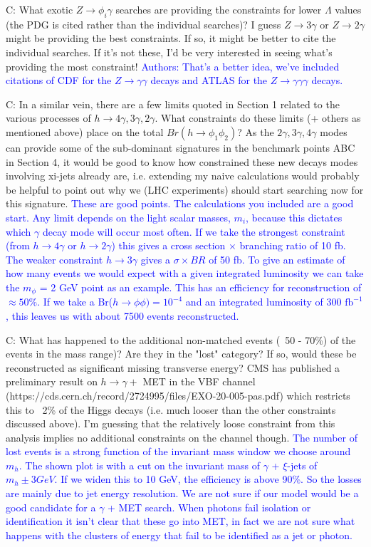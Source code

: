 \documentclass[12pt]{article}
\begin{document}
C: What exotic $Z\to \phi_i\gamma$  searches are providing the constraints for lower $\Lambda$ values (the PDG is cited rather than the individual searches)? I guess $Z\to3\gamma$ or $Z\to2\gamma$ might be providing the best constraints. If so, it might be better to cite the individual searches. If it's not these, I'd be very interested in seeing what's providing the most constraint!
\vskip 0.12in
\textcolor{blue}{Authors: That's a better idea, we've included citations of CDF for the $Z\to\gamma\gamma$ decays and ATLAS for the $Z\to\gamma\gamma\gamma$ decays.}

\vskip 0.12in

C: In a similar vein, there are a few limits quoted in Section 1 related to the various processes of $h\to4\gamma,3\gamma,2\gamma$. What constraints do these limits (+ others as mentioned above) place on the total $Br(h\to\phi_1 \phi_2)$? As the $2\gamma,3\gamma,4\gamma$ modes can provide some of the sub-dominant signatures in the benchmark points ABC in Section 4, it would be good to know how constrained these new decays modes involving xi-jets already are, i.e. extending my naive calculations would probably be helpful to point out why we (LHC experiments) should start searching now for this signature.
\vskip 0.12in
\textcolor{blue}{These are good points. The calculations you included are a good start.  Any limit depends on the light scalar masses, $m_{i}$, because this dictates which $\gamma$ decay mode will occur most often. If we take the strongest constraint (from $h\to4\gamma$ or $h\to2\gamma$) this gives a cross section $\times$ branching ratio of 10 fb. The weaker constraint $h\to3\gamma$ gives a $\sigma\times BR$ of 50 fb. To give an estimate of how many events we would expect with a given integrated luminosity we can take the $m_{\phi}$ = 2 GeV point as an example. This has an efficiency for reconstruction of $\approx50\%$. If we take a Br($h\to\phi\phi) = 10^{-4}$ and an integrated luminosity of 300 $\text{fb}^{-1}$, this leaves us with about 7500 events reconstructed.}
\vskip 0.12in

C: What has happened to the additional non-matched events  (~50 - 70\%) of the events in the mass range)? Are they in the "lost" category? If so, would these be reconstructed as significant missing transverse energy? CMS has published a preliminary result on $h\to\gamma + $ MET in the VBF channel (https://cds.cern.ch/record/2724995/files/EXO-20-005-pas.pdf) which restricts this to ~2\% of the Higgs decays (i.e. much looser than the other constraints discussed above). I'm guessing that the relatively loose constraint from this analysis implies no additional constraints on the channel though.
\vskip 0.12in
\textcolor{blue}{The number of lost events is a strong function of the invariant mass window we choose around $m_{h}$. The shown plot is with a cut on the invariant mass of $\gamma$ + $\xi$-jets of $m_{h}\pm 3 GeV$. If we widen this to 10 GeV, the efficiency is above 90\%. So the losses are mainly due to jet energy resolution. We are not sure if our model would be a good candidate for a $\gamma$ + MET search. When photons fail isolation or identification it isn't clear that these go into MET, in fact we are not sure what happens with the clusters of energy that fail to be identified as a jet or photon.}
\vskip 0.12in
\end{document}
